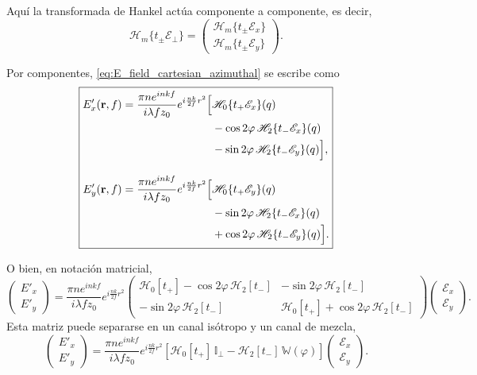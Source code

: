 Aquí la transformada de Hankel actúa componente a componente, es decir,
\begin{equation}
\mathscr H_m\{t_\pm\mathscr E_\perp\}
=
\begin{pmatrix}
\mathscr H_m\{t_\pm\mathscr E_x\}\\
\mathscr H_m\{t_\pm\mathscr E_y\}
\end{pmatrix}.
\label{eq:Hankel_componentwise_cartesian}
\end{equation}

Por componentes, \eqref{eq:E_field_cartesian_azimuthal} se escribe como
\begin{equation}
\boxed{
\begin{aligned}
E'_x(\vb r,f)
=
\frac{\pi n e^{inkf}}{i\lambda f z_0}
e^{i\frac{nk}{2f}r^2}
\Big[
&
\mathscr H_0\{t_+\mathscr E_x\}(q)
\\
&
-
\cos2\varphi\,
\mathscr H_2\{t_-\mathscr E_x\}(q)
\\
&
-
\sin2\varphi\,
\mathscr H_2\{t_-\mathscr E_y\}(q)
\Big],
\\[1em]
E'_y(\vb r,f)
=
\frac{\pi n e^{inkf}}{i\lambda f z_0}
e^{i\frac{nk}{2f}r^2}
\Big[
&
\mathscr H_0\{t_+\mathscr E_y\}(q)
\\
&
-
\sin2\varphi\,
\mathscr H_2\{t_-\mathscr E_x\}(q)
\\
&
+
\cos2\varphi\,
\mathscr H_2\{t_-\mathscr E_y\}(q)
\Big].
\end{aligned}
}
\label{eq:Ex_Ey_Hankel_cartesian}
\end{equation}

O bien, en notación matricial,
\begin{equation}
\boxed{
\begin{pmatrix}
E'_x\\
E'_y
\end{pmatrix}
=
\frac{\pi n e^{inkf}}{i\lambda f z_0}
e^{i\frac{nk}{2f}r^2}
\begin{pmatrix}
\mathscr H_0[t_+] - \cos2\varphi\,\mathscr H_2[t_-]
&
-\sin2\varphi\,\mathscr H_2[t_-]
\\
-\sin2\varphi\,\mathscr H_2[t_-]
&
\mathscr H_0[t_+] + \cos2\varphi\,\mathscr H_2[t_-]
\end{pmatrix}
\begin{pmatrix}
\mathscr E_x\\
\mathscr E_y
\end{pmatrix}.
}
\label{eq:Ex_Ey_Hankel_cartesian_matrix}
\end{equation}
Esta matriz puede separarse en un canal isótropo y un canal de mezcla,
\begin{equation}
\begin{pmatrix}
E'_x\\
E'_y
\end{pmatrix}
=
\frac{\pi n e^{inkf}}{i\lambda f z_0}
e^{i\frac{nk}{2f}r^2}
\left[
\mathscr H_0[t_+]\,\mathbb I_\perp
-
\mathscr H_2[t_-]\,\mathbb W(\varphi) \right]
\begin{pmatrix}
\mathscr E_x\\
\mathscr E_y
\end{pmatrix}.
\label{eq:Ex_Ey_Hankel_cartesian_matrix_separated}
\end{equation}

